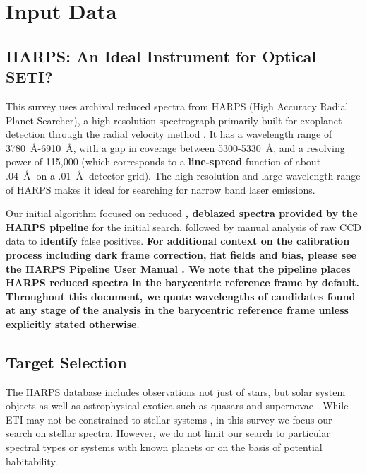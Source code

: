 \documentclass[linenumbers]{aastex701}
\providecommand{\DIFadd}[1]{{\bf #1}} %
\providecommand{\DIFaddbegin}{} %
\providecommand{\DIFaddend}{} %
\begin{document}
\section{Input Data}
\subsection{HARPS: An Ideal Instrument for Optical SETI?}
This survey uses archival reduced spectra from HARPS (High Accuracy Radial Planet Searcher), a high resolution spectrograph primarily built for exoplanet detection through the radial velocity method \citep{HARPS_specs}. It has a wavelength range of 3780~\AA-6910~\AA, with a gap in coverage between 5300-5330~\AA, and a resolving power of 115,000 (which corresponds to a  \DIFaddbegin \DIFadd{line-spread }\DIFaddend function of about .04~\AA\DIFaddbegin \DIFadd{~}\DIFaddend on a .01~\AA\DIFaddbegin \DIFadd{~}\DIFaddend detector grid). The high resolution and large wavelength range of HARPS makes it ideal for searching for narrow band laser emissions. 

Our initial algorithm focused on reduced \DIFaddbegin \DIFadd{, deblazed spectra provided by the HARPS pipeline }\DIFaddend for the initial search, followed by manual analysis of raw CCD data to  \DIFaddbegin \DIFadd{identify }\DIFaddend false positives.   \DIFaddbegin \DIFadd{For additional context on the calibration process including dark frame correction, flat fields and bias, please see the HARPS Pipeline User Manual \citep{UserManual}. We note that the pipeline places HARPS reduced spectra in the barycentric reference frame by default. Throughout this document, we quote wavelengths of candidates found at any stage of the analysis in the barycentric reference frame unless explicitly stated otherwise}\DIFaddend .

\subsection{Target Selection}
\label{Target_Selection}
The HARPS database includes observations not just of stars, but solar system objects as well as  astrophysical exotica such as quasars and supernovae \citep{trifonov_2020}.  While ETI may not be constrained to stellar systems \citep{CIRKOVIC2018289}, in this survey we focus our search on stellar spectra. However, we do not limit our search to particular spectral types or systems with known planets or on the basis of potential habitability.
\end{document}
